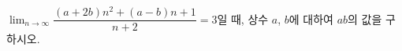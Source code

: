 $\displaystyle\lim_{n\to\infty}\dfrac{(a+2b)n^2+(a-b)n+1}{n+2}=3$일 때, 상수 $a$, $b$에 대하여 $ab$의 값을 구하시오.
